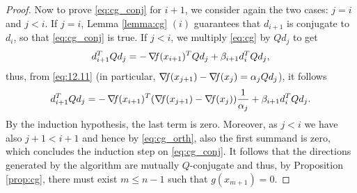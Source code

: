\documentclass[10pt,a4paper]{article}
\begin{document}
\begin{proof}
Now to prove \eqref{eq:cg_conj} for $i+1$, we consider again the two cases: $j = i$ and $j < i$. If $j = i$, Lemma \ref{lemma:cg} $(i)$ guarantees that $d_{i+1}$ is conjugate to $d_i$, so that \eqref{eq:cg_conj} is true. If $j < i$, we multiply \eqref{eq:cg} by $Q d_j$ to get 
\begin{equation*}
	d_{i+1}^T Q d_j = -\operatorname*{\mathit{\nabla \!f}}(x_{i+1})^T Q d_j + \beta_{i+1} d_i^T Q d_j,
\end{equation*}
thus, from \eqref{eq:12.11} (in particular, $\operatorname*{\mathit{\nabla \!f}}(x_{j+1}) -\operatorname*{\mathit{\nabla \!f}}(x_j) =\alpha_j Q d_j$), it follows
\begin{equation*}
	d_{i+1}^T Q d_j = -\operatorname*{\mathit{\nabla \!f}}(x_{i+1})^T (\operatorname*{\mathit{\nabla \!f}}(x_{j+1}) - \operatorname*{\mathit{\nabla \!f}}(x_j)) \frac{1}{\alpha_j} + \beta_{i+1} d_i^T Q d_j. 
\end{equation*}
By the induction hypothesis, the last term is zero. Moreover, as $j < i$ we have also $j + 1 < i + 1$ and hence by \eqref{eq:cg_orth}, also the first summand is zero, which concludes the induction step on \eqref{eq:cg_conj}. It follows that the directions generated by the algorithm are mutually $Q$-conjugate and thus, by Proposition \ref{prop:cg}, there must exist $m \leq n - 1$ such that $g(x_{m+1}) = 0$.
\end{proof}
\end{document}
